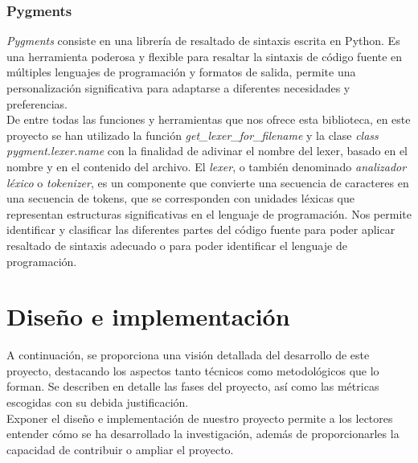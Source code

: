 \documentclass[a4paper, 12pt]{book}
\begin{document}
\subsection{Pygments}
\label{subsec:pygments}

\textit{Pygments} consiste en una librería de resaltado de sintaxis escrita en Python. Es una herramienta poderosa y flexible para resaltar la sintaxis de código fuente en múltiples lenguajes de programación y formatos
de salida, permite una personalización significativa para adaptarse a diferentes necesidades y preferencias.
\\De entre todas las funciones y herramientas que nos ofrece esta biblioteca, en este proyecto se han utilizado la función \textit{get\_lexer\_for\_filename} y la clase \textit{class pygment.lexer.name} con la finalidad
de adivinar el nombre del lexer, basado en el nombre y en el contenido del archivo. El \textit{lexer}, o también denominado \textit{analizador léxico} o \textit{tokenizer}, es un componente que convierte una secuencia de caracteres
en una secuencia de tokens, que se corresponden con unidades léxicas que representan estructuras significativas en el lenguaje de programación. Nos permite identificar y clasificar las diferentes partes del código fuente para poder
aplicar resaltado de sintaxis adecuado o para poder identificar el lenguaje de programación.



\cleardoublepage
\chapter{Diseño e implementación}
\label{chap:diseño-implementacion}
\label{sec:diseno}

A continuación, se proporciona una visión detallada del desarrollo de este proyecto, destacando los aspectos tanto técnicos como metodológicos que lo forman. Se describen en detalle las fases del proyecto, así como las métricas escogidas
con su debida justificación.
\\Exponer el diseño e implementación de nuestro proyecto permite a los lectores entender cómo se ha desarrollado la investigación, además de proporcionarles la capacidad de contribuir o ampliar el proyecto.
\end{document}
